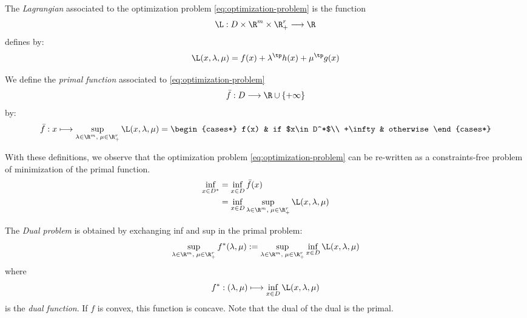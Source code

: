 \documentclass{../cs-classes/cs-classes}
\begin{document}
\begin{definition}[Lagrangian]
    The \emph{Lagrangian} associated to the optimization problem \eqref{eq:optimization-problem} is the function
    \begin{equation*}
        \L:D\times\R^m\times\R_+^r \longrightarrow \R
    \end{equation*}
    defines by:
    \begin{equation*}
        \L(x, \lambda, \mu) = f(x) + \lambda^\tp h(x) + \mu^\tp g(x)
    \end{equation*}
\end{definition}

\begin{definition}
    We define the \emph{primal function} associated to \eqref{eq:optimization-problem}
    \begin{equation*}
        \bar{f}:D\longrightarrow\R\cup\{+\infty\}
    \end{equation*}
    by:
    \begin{equation*}
        \bar{f} : x \longmapsto \sup_{\lambda\in\R^m, \;\mu\in\R^r_+} \L(x, \lambda, \mu) = \begin{cases*}
            f(x) & if $x\in D^*$\\
            +\infty & otherwise
        \end{cases*}
    \end{equation*}
\end{definition}

\begin{definition}
    With these definitions, we observe that the optimization problem \eqref{eq:optimization-problem} can be re-written as a constraints-free problem of minimization of the primal function.
    \begin{equation*}
        \begin{aligned}
            \inf_{x\in D^*} &= \inf_{x\in D}\bar{f}(x)\\
            &= \inf_{x\in D} \sup_{\lambda\in\R^m, \;\mu\in\R^r_+} \L(x, \lambda, \mu)
        \end{aligned}
    \end{equation*}
\end{definition}

\begin{definition}
    The \emph{Dual problem} is obtained by exchanging inf and sup in the primal problem:
    \begin{equation*}
        \sup_{\lambda\in\R^m, \;\mu\in\R^r_+} f^*(\lambda, \mu) := \sup_{\lambda\in\R^m, \;\mu\in\R^r_+} \inf_{x\in D}\L(x, \lambda, \mu)
    \end{equation*}
    where
    \begin{equation*}
        f^* : (\lambda, \mu) \longmapsto \inf_{x\in D}\L(x, \lambda, \mu)
    \end{equation*}
    is the \emph{dual function}. If $f$ is convex, this function is concave. Note that the dual of the dual is the primal.
\end{definition}
\end{document}

